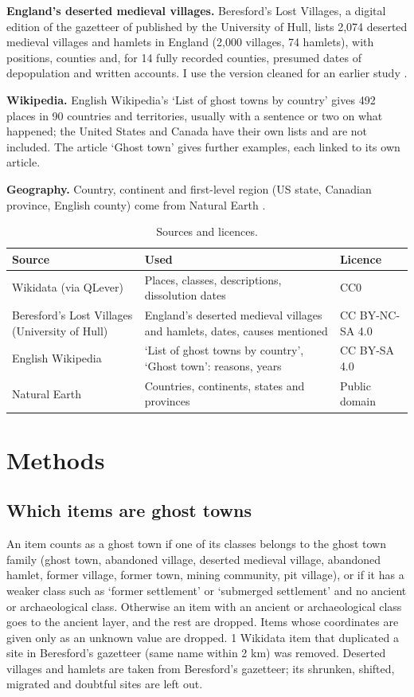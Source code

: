 \documentclass[11pt,a4paper]{article}
\begin{document}
\textbf{England's deserted medieval villages.} Beresford's Lost Villages, a digital edition of the gazetteer of \citet{beresfordhurst1971} published by the University of Hull, lists 2,074 deserted medieval villages and hamlets in England (2,000 villages, 74 hamlets), with positions, counties and, for 14 fully recorded counties, presumed dates of depopulation and written accounts. I use the version cleaned for an earlier study \citep{hotham2026lv}.

\textbf{Wikipedia.} English Wikipedia's `List of ghost towns by country' \citep{wikilist} gives 492 places in 90 countries and territories, usually with a sentence or two on what happened; the United States and Canada have their own lists and are not included. The article `Ghost town' \citep{wikighost} gives further examples, each linked to its own article.

\textbf{Geography.} Country, continent and first-level region (US state, Canadian province, English county) come from Natural Earth \citep{naturalearth}.

\begin{table}[tbp]\centering\small\caption{Sources and licences.}\label{tab:sources}
\begin{tabular}{>{\raggedright\arraybackslash}p{4.4cm}>{\raggedright\arraybackslash}p{6.8cm}>{\raggedright\arraybackslash}p{3.2cm}}\toprule Source & Used & Licence\\\midrule
Wikidata (via QLever) & Places, classes, descriptions, dissolution dates & CC0\\
Beresford's Lost Villages (University of Hull) & England's deserted medieval villages and hamlets, dates, causes mentioned & CC BY-NC-SA 4.0\\
English Wikipedia & `List of ghost towns by country', `Ghost town': reasons, years & CC BY-SA 4.0\\
Natural Earth & Countries, continents, states and provinces & Public domain\\
\bottomrule\end{tabular}\end{table}

\section{Methods}\label{sec:methods}
\subsection{Which items are ghost towns}
An item counts as a ghost town if one of its classes belongs to the ghost town family (ghost town, abandoned village, deserted medieval village, abandoned hamlet, former village, former town, mining community, pit village), or if it has a weaker class such as `former settlement' or `submerged settlement' and no ancient or archaeological class. Otherwise an item with an ancient or archaeological class goes to the ancient layer, and the rest are dropped. Items whose coordinates are given only as an unknown value are dropped. 1 Wikidata item that duplicated a site in Beresford's gazetteer (same name within 2 km) was removed. Deserted villages and hamlets are taken from Beresford's gazetteer; its shrunken, shifted, migrated and doubtful sites are left out.
\end{document}
